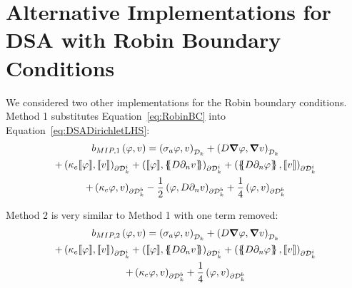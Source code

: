 \documentclass{article}
\begin{document}
\section{Alternative Implementations for DSA with Robin Boundary Conditions}
\label{sec:AltImpDSARobinBCs}
We considered two other implementations for the Robin boundary conditions. Method 1 substitutes Equation~\ref{eq:RobinBC} into Equation~\ref{eq:DSADirichletLHS}:
\begin{multline}
b_{MIP,1} \left( \varphi, v \right) = \left( \sigma_a \varphi, v \right)_{\mathcal{D}_k} + \left( D \grad \varphi, \grad v \right)_{\mathcal{D}_k} \\
+ \left( \kappa_e \llbracket \varphi \rrbracket, \llbracket v \rrbracket \right)_{\partial \mathcal{D}_k^i}
+ \left( \llbracket \varphi \rrbracket , \left\{\!\!\left\{ D \partial_n v \right\} \!\! \right\} \right)_{\partial \mathcal{D}_k^i} + \left( \left\{ \!\! \left\{ D \partial_n \varphi \right\} \!\! \right\} , \llbracket v \rrbracket \right)_{\partial \mathcal{D}_k^i} \\
+ \left(\kappa_e \varphi, v \right)_{\partial \mathcal{D}_k^b}
- \frac{1}{2} \left(\varphi, D \partial_n v \right)_{\partial \mathcal{D}_k^b}
+ \frac{1}{4} \left(\varphi, v \right)_{\partial \mathcal{D}_k^b}
\label{eq:Method1}
\end{multline}

Method 2 is very similar to Method 1 with one term removed:
\begin{multline}
b_{MIP,2} \left( \varphi, v \right) = \left( \sigma_a \varphi, v \right)_{\mathcal{D}_k} + \left( D \grad \varphi, \grad v \right)_{\mathcal{D}_k} \\
+ \left( \kappa_e \llbracket \varphi \rrbracket, \llbracket v \rrbracket \right)_{\partial \mathcal{D}_k^i}
+ \left( \llbracket \varphi \rrbracket , \left\{\!\!\left\{ D \partial_n v \right\} \!\! \right\} \right)_{\partial \mathcal{D}_k^i} + \left( \left\{ \!\! \left\{ D \partial_n \varphi \right\} \!\! \right\} , \llbracket v \rrbracket \right)_{\partial \mathcal{D}_k^i} \\
+ \left(\kappa_e \varphi, v \right)_{\partial \mathcal{D}_k^b}
+ \frac{1}{4} \left(\varphi, v \right)_{\partial \mathcal{D}_k^b}
\label{eq:Method2}
\end{multline}
\end{document}

